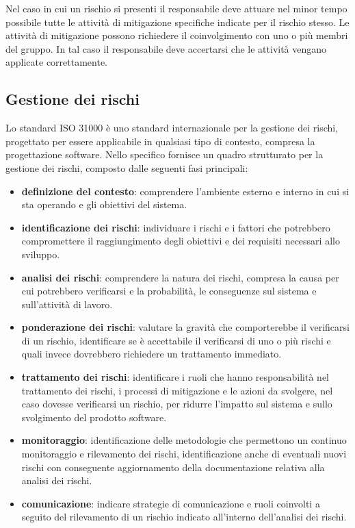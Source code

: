 \begin{enumerate}
    Nel caso in cui un rischio si presenti il responsabile deve attuare nel minor tempo possibile tutte le attività di mitigazione specifiche indicate per il rischio stesso.
    Le attività di mitigazione possono richiedere il coinvolgimento con uno o più membri del gruppo.
    In tal caso il responsabile deve accertarsi che le attività vengano applicate correttamente. 
\end{enumerate}

\subsection{Gestione dei rischi}
Lo standard ISO 31000 è uno standard internazionale per la gestione dei rischi, progettato per essere applicabile  in qualsiasi tipo di contesto, compresa la progettazione software.
Nello specifico fornisce un quadro strutturato per la gestione dei rischi, composto dalle seguenti fasi principali: 
\begin{itemize}
    \item \textbf{definizione del contesto}: comprendere l'ambiente esterno e interno in cui si sta operando e gli obiettivi del sistema.
    \item \textbf{identificazione dei rischi}: individuare i rischi e i fattori che potrebbero compromettere il raggiungimento degli obiettivi e dei requisiti necessari allo sviluppo.
    \item \textbf{analisi dei rischi}:  comprendere la natura dei rischi, compresa la causa per cui potrebbero verificarsi e la probabilità, le conseguenze sul sistema e sull'attività di lavoro.
    \item \textbf{ponderazione dei rischi}: valutare la gravità che comporterebbe il verificarsi di un rischio, identificare se è accettabile il verificarsi di uno o più rischi e quali invece dovrebbero richiedere un trattamento immediato.
    \item \textbf{trattamento dei rischi}: identificare i ruoli che hanno responsabilità nel trattamento dei rischi, i processi di mitigazione e le azioni da svolgere, nel caso dovesse verificarsi un rischio, per ridurre l'impatto sul sistema e sullo svolgimento del prodotto software. 
    \item \textbf{monitoraggio}: identificazione delle metodologie che permettono un continuo monitoraggio e rilevamento dei rischi, identificazione anche di eventuali nuovi rischi con conseguente aggiornamento della documentazione relativa alla analisi dei rischi.
    \item \textbf{comunicazione}: indicare strategie di comunicazione e ruoli coinvolti a seguito del rilevamento di un rischio indicato all'interno dell'analisi dei rischi.
\end{itemize}
